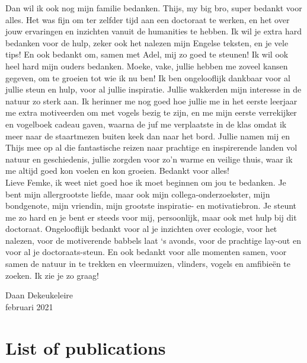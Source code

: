 \documentclass[10pt, twoside]{book} %
\renewcommand{\chaptermark}[1]{\markboth{#1}{}}
\begin{document}
Dan wil ik ook nog mijn familie bedanken. Thijs, my big bro, super bedankt voor alles. Het was fijn om ter zelfder tijd aan een doctoraat te werken, en het over jouw ervaringen en inzichten vanuit de humanities te hebben. Ik wil je extra hard bedanken voor de hulp, zeker ook het nalezen mijn Engelse teksten, en je vele tips! En ook bedankt om, samen met Adel, mij zo goed te steunen! Ik wil ook heel hard mijn ouders bedanken. Moeke, vake, jullie hebben me zoveel kansen gegeven, om te groeien tot wie ik nu ben! Ik ben ongelooflijk dankbaar voor al jullie steun en hulp, voor al jullie inspiratie. Jullie wakkerden mijn interesse in de natuur zo sterk aan. Ik herinner me nog goed hoe jullie me in het eerste leerjaar me extra motiveerden om met vogels bezig te zijn, en me mijn eerste verrekijker en vogelboek cadeau gaven, waarna de juf me verplaatste in de klas omdat ik meer naar de staartmezen buiten keek dan naar het bord. Jullie namen mij en Thijs mee op al die fantastische reizen naar prachtige en inspirerende landen vol natuur en geschiedenis, jullie zorgden voor zo'n warme en veilige thuis, waar ik me altijd goed kon voelen en kon groeien. Bedankt voor alles!\\

Lieve Femke, ik weet niet goed hoe ik moet beginnen om jou te bedanken. Je bent mijn allergrootste liefde, maar ook mijn collega-onderzoekster, mijn bondgenote, mijn vriendin, mijn grootste inspiratie- en motivatiebron. Je steunt me zo hard en je bent er steeds voor mij, persoonlijk, maar ook met hulp bij dit doctoraat. Ongelooflijk bedankt voor al je inzichten over ecologie, voor het nalezen, voor de motiverende babbels laat `s avonds, voor de prachtige lay-out en voor al je doctoraats-steun. En ook bedankt voor alle momenten samen, voor samen de natuur in te trekken en vleermuizen, vlinders, vogels en amfibie\"{e}n te zoeken. Ik zie je zo graag!\\

\begin{flushright}
Daan Dekeukeleire\\
februari 2021
\end{flushright}


\clearpage
\thispagestyle{plain}
\hbox{}
\clearpage

\thispagestyle{plain} %
\newpage{\thispagestyle{empty}\cleardoublepage}
\ClearWallPaper
\pagestyle{mainmatter}
\chapter*{List of publications}
\chaptermark{List of publications}
\end{document}
